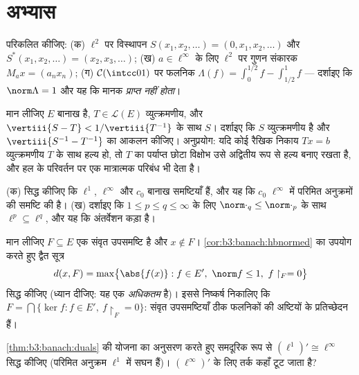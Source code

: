 \section{अभ्यास}

\begin{exercise}[$\star$]\label{exo:b3:banach:1}
 परिकलित कीजिए:
(क) $\ell^2$ पर विस्थापन $S(x_1, x_2, \dots) = (0, x_1, x_2, \dots)$ और $S^*(x_1, x_2, \dots) = (x_2, x_3, \dots)$;
(ख) $a \in \ell^\infty$ के लिए $\ell^2$ पर गुणन संकारक $M_a x = (a_nx_n)$;
(ग) $\mathcal C(\intcc01)$ पर फलनिक $\Lambda(f) = \int_0^{1/2}f -
\int_{1/2}^1f$ --- दर्शाइए कि $\norm\Lambda = 1$ और यह कि मानक
\emph{प्राप्त नहीं होता}।
\end{exercise}

\begin{exercise}[$\star$]\label{exo:b3:banach:2}
मान लीजिए $E$ बानाख है, $T \in \mathcal L(E)$ व्युत्क्रमणीय, और $\vertiii{S - T} < 1/\vertiii{T^{-1}}$ के साथ
$S$। दर्शाइए कि $S$ व्युत्क्रमणीय है और $\vertiii{S^{-1} - T^{-1}}$ का आकलन कीजिए।
अनुप्रयोग: यदि कोई रैखिक निकाय $Tx = b$ व्युत्क्रमणीय $T$ के साथ
हल्य हो, तो $T$ का पर्याप्त छोटा विक्षोभ उसे अद्वितीय रूप से
हल्य बनाए रखता है, और हल के परिवर्तन पर एक मात्रात्मक परिबंध भी
देता है।
\end{exercise}

\begin{exercise}[$\star\star$]\label{exo:b3:banach:3}
(क) सिद्ध कीजिए कि $\ell^1$, $\ell^\infty$ और $c_0$ बानाख समष्टियाँ हैं, और
यह कि $c_0$ $\ell^\infty$ में परिमित अनुक्रमों की समष्टि की  है।
(ख) दर्शाइए कि $1 \leq p \leq q \leq \infty$ के लिए $\norm\cdot_q \leq
\norm\cdot_p$ के साथ $\ell^p \subseteq \ell^q$, और यह कि
अंतर्वेशन कड़ा है।
\end{exercise}

\begin{exercise}[$\star\star$]\label{exo:b3:banach:4}
मान लीजिए $F \subseteq E$ एक संवृत उपसमष्टि है और $x \notin F$। \cref{cor:b3:banach:hbnormed} का उपयोग
करते हुए द्वैत सूत्र
\[
d(x, F) = \max\bigl\{\abs{f(x)} : f \in E',\ \norm f \leq 1,\
f\restriction_F = 0\bigr\}
\]
सिद्ध कीजिए (ध्यान दीजिए: यह एक \emph{अधिकतम} है)। इससे निष्कर्ष
निकालिए कि $F = \bigcap\{\ker f : f
\in E',\ f\restriction_F = 0\}$: संवृत उपसमष्टियाँ ठीक फलनिकों की अष्टियों के
प्रतिच्छेदन हैं।
\end{exercise}

\begin{exercise}[$\star\star$]\label{exo:b3:banach:5}
\cref{thm:b3:banach:duals} की योजना का अनुसरण करते हुए समदूरिक रूप से $(\ell^1)' \cong \ell^\infty$ सिद्ध
कीजिए (परिमित अनुक्रम $\ell^1$ में सघन हैं)। $(\ell^\infty)'$ के लिए तर्क कहाँ
टूट जाता है?
\end{exercise}

